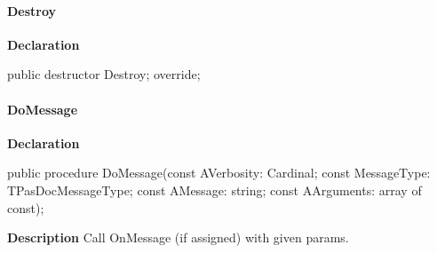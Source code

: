 \documentclass{report}
\newif\ifpdf
\begin{document}
\paragraph*{Destroy}\hspace*{\fill}

\label{PasDoc_TagManager.TTagManager-Destroy}
\begin{list}{}{
\setlength{\itemindent}{0cm}
\setlength{\listparindent}{0cm}
\setlength{\leftmargin}{\evensidemargin}
\addtolength{\leftmargin}{\tmplength}
\settowidth{\labelsep}{X}
\addtolength{\leftmargin}{\labelsep}
\setlength{\labelwidth}{\tmplength}
}
\item[\textbf{Declaration}\hfill]
\ifpdf
\begin{flushleft}
\fi
\begin{ttfamily}
public destructor Destroy; override;\end{ttfamily}

\ifpdf
\end{flushleft}
\fi

\end{list}
\paragraph*{DoMessage}\hspace*{\fill}

\label{PasDoc_TagManager.TTagManager-DoMessage}
\begin{list}{}{
\setlength{\itemindent}{0cm}
\setlength{\listparindent}{0cm}
\setlength{\leftmargin}{\evensidemargin}
\addtolength{\leftmargin}{\tmplength}
\settowidth{\labelsep}{X}
\addtolength{\leftmargin}{\labelsep}
\setlength{\labelwidth}{\tmplength}
}
\item[\textbf{Declaration}\hfill]
\ifpdf
\begin{flushleft}
\fi
\begin{ttfamily}
public procedure DoMessage(const AVerbosity: Cardinal; const MessageType: TPasDocMessageType; const AMessage: string; const AArguments: array of const);\end{ttfamily}

\ifpdf
\end{flushleft}
\fi

\par
\item[\textbf{Description}]
Call OnMessage (if assigned) with given params.

\end{list}
\end{document}
